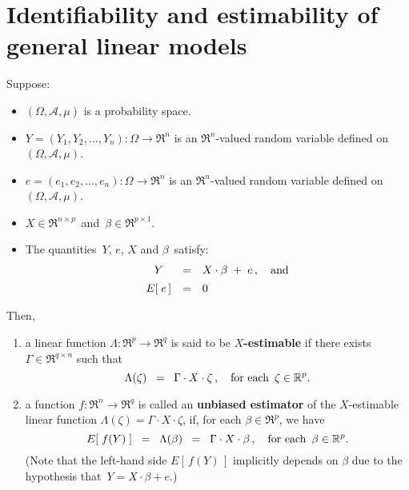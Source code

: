 

\section{Identifiability and estimability of general linear models}
\setcounter{theorem}{0}
\setcounter{equation}{0}

\renewcommand{\theenumi}{\roman{enumi}}
\renewcommand{\labelenumi}{\textnormal{(\theenumi)}$\;\;$}


\begin{definition}
\mbox{}\vskip 0.1cm\noindent
Suppose:
\begin{itemize}
\item
	$(\Omega,\mathcal{A},\mu)$ is a probability space.
\item
	$Y = (Y_{1}, Y_{2}, \ldots, Y_{n}) : \Omega \longrightarrow \Re^{n}$ is an $\Re^{n}$-valued random variable
	defined on $(\Omega,\mathcal{A},\mu)$.
\item
	$e = (e_{1}, e_{2}, \ldots, e_{n}) : \Omega \longrightarrow \Re^{n}$ is an $\Re^{n}$-valued random variable
	defined on $(\Omega,\mathcal{A},\mu)$.
\item
	$X \in \Re^{n \times p}$\, and \,$\beta \in \Re^{p \times 1}$.
\item
	The quantities \,$Y$, $e$, $X$ and $\beta$\, satisfy:
	\begin{equation*}
	\begin{array}{ccl}
	Y & = & X \cdot \beta \; + \; e\,, \quad\textnormal{and}
	\\
	E\!\left[\;e\,\right] & \overset{{\color{white}\vert}}{=} & 0
	\end{array}
	\end{equation*}
\end{itemize}
Then,
\begin{enumerate}
\item
	a linear function $\Lambda : \Re^{p} \longrightarrow \Re^{q}$ is said to be \textbf{$X$-estimable}
	if there exists $\Gamma \in \Re^{q \times n}$ such that
	\begin{equation*}
	\Lambda(\zeta) \;\; =\;\; \Gamma \cdot X \cdot \zeta\,,
	\quad
	\textnormal{for each \,$\zeta \in \Re^{p}$}.
	\end{equation*}
\item
	a function $f : \Re^{n} \longrightarrow \Re^{q}$ is called an \textbf{unbiased estimator}
	of the $X$-estimable linear function $\Lambda(\zeta) = \Gamma \cdot X \cdot \zeta$,
	if, for each $\beta \in \Re^{p}$, we have
	\begin{equation*}
	E\!\left[\;f(Y)\;\right] \;\; =\;\; \Lambda(\beta) \;\;=\;\; \Gamma \cdot X \cdot \beta\,,
	\quad
	\textnormal{for each \,$\beta \in \Re^{p}$}.
	\end{equation*}
	(Note that the left-hand side $E\!\left[\,f(Y)\,\right]$ implicitly depends on $\beta$
	due to the hypothesis that \,$Y = X \cdot \beta + e$.)
\end{enumerate}
\end{definition}

